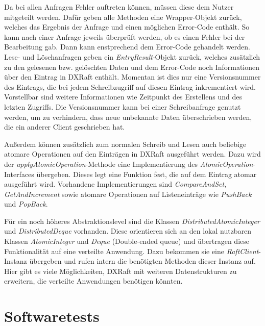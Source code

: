 Da bei allen Anfragen Fehler auftreten können, müssen diese dem Nutzer mitgeteilt werden. Dafür geben alle Methoden eine Wrapper-Objekt zurück, welches das Ergebnis der Anfrage und einen möglichen Error-Code enthält. So kann nach einer Anfrage jeweils überprüft werden, ob es einen Fehler bei der Bearbeitung gab. Dann kann enstprechend dem Error-Code gehandelt werden. Lese- und Löschanfragen geben ein \textit{EntryResult}-Objekt zurück, welches zusätzlich zu den gelesenen bzw. gelöschten Daten und dem Error-Code noch Informationen über den Eintrag in DXRaft enthält. Momentan ist dies nur eine Versionsnummer des Eintrags, die bei jedem Schreibzugriff auf diesen Eintrag inkrementiert wird. Vorstellbar sind weitere Informationen wie Zeitpunkt des Erstellens und des letzten Zugriffs. Die Versionsnummer kann bei einer Schreibanfrage genutzt werden, um zu verhindern, dass neue unbekannte Daten überschrieben werden, die ein anderer Client geschrieben hat.

Außerdem können zusätzlich zum normalen Schreib und Lesen auch beliebige atomare Operationen auf den Einträgen in DXRaft ausgeführt werden. Dazu wird der \textit{applyAtomicOperation}-Methode eine Implementierung des \textit{AtomicOperation}-Interfaces übergeben. Dieses legt eine Funktion fest, die auf dem Eintrag atomar ausgeführt wird. Vorhandene Implementierungen sind \textit{CompareAndSet}, \textit{GetAndIncrement} sowie atomare Operationen auf Listeneinträge wie \textit{PushBack} und \textit{PopBack}.

Für ein noch höheres Abstraktionslevel sind die Klassen \textit{DistributedAtomicInteger} und \textit{DistributedDeque} vorhanden. Diese orientieren sich an den lokal nutzbaren Klassen \textit{AtomicInteger} und \textit{Deque} (Double-ended queue) und übertragen diese Funktionalität auf eine verteilte Anwendung. Dazu bekommen sie eine \textit{RaftClient}-Instanz übergeben und rufen intern die benötigten Methoden dieser Instanz auf. Hier gibt es viele Möglichkeiten, DXRaft mit weiteren Datenstrukturen zu erweitern, die verteilte Anwendungen benötigen könnten.

\section{Softwaretests}

